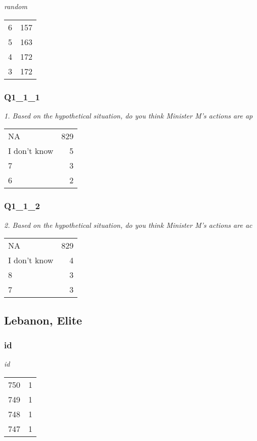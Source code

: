 \documentclass[
]{article}
\begin{document}
\textit{random}

\begin{longtable}[]{@{}lr@{}}
\toprule
\endhead
6 & 157\tabularnewline
5 & 163\tabularnewline
4 & 172\tabularnewline
3 & 172\tabularnewline
\bottomrule
\end{longtable}

\hypertarget{q1_1_1}{%
\subsubsection{Q1\_1\_1}\label{q1_1_1}}

\textit{1. Based on the hypothetical situation, do you think Minister M’s actions are ap}

\begin{longtable}[]{@{}lr@{}}
\toprule
\endhead
NA & 829\tabularnewline
I don't know & 5\tabularnewline
7 & 3\tabularnewline
6 & 2\tabularnewline
\bottomrule
\end{longtable}

\hypertarget{q1_1_2}{%
\subsubsection{Q1\_1\_2}\label{q1_1_2}}

\textit{2. Based on the hypothetical situation, do you think Minister M’s actions are ac}

\begin{longtable}[]{@{}lr@{}}
\toprule
\endhead
NA & 829\tabularnewline
I don't know & 4\tabularnewline
8 & 3\tabularnewline
7 & 3\tabularnewline
\bottomrule
\end{longtable}

\hypertarget{lebanon-elite}{%
\subsection{Lebanon, Elite}\label{lebanon-elite}}

\hypertarget{id-1}{%
\subsubsection{id}\label{id-1}}

\textit{id}

\begin{longtable}[]{@{}lr@{}}
\toprule
\endhead
750 & 1\tabularnewline
749 & 1\tabularnewline
748 & 1\tabularnewline
747 & 1\tabularnewline
\bottomrule
\end{longtable}
\end{document}
